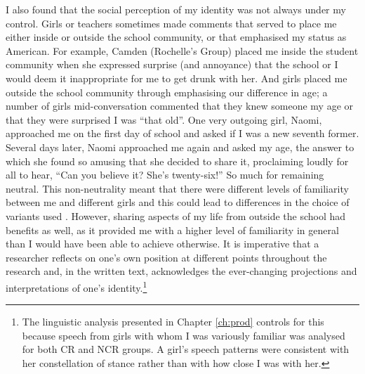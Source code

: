 I also found that the social perception of my identity was not always under my control. Girls or teachers sometimes made comments that served to place me either inside or outside the school community, or that emphasised my status as American. For example, Camden (Rochelle's Group) placed me inside the student community when she expressed surprise (and annoyance) that the school or I would deem it inappropriate for me to get drunk with her. And girls placed me outside the school community through emphasising our difference in age; a number of girls mid-conversation commented that they knew someone my age or that they were surprised I was ``that old''. One very outgoing girl, Naomi, approached me on the first day of school and asked if I was a new seventh former. Several days later, Naomi approached me again and asked my age, the answer to which she found so amusing that she decided to share it, proclaiming loudly for all to hear, ``Can you believe it?  She's twenty-six!''  So much for remaining neutral. This non-neutrality meant that there were different levels of familiarity between me and different girls and this could lead to differences in the choice of variants used \citep{cukoravilabailey}. However, sharing aspects of my life from outside the school had benefits as well, as it provided me with a higher level of familiarity in general than I would have been able to achieve otherwise. It is imperative that a researcher reflects on one's own position at different points throughout the research and, in the written text, acknowledges the ever-changing projections and interpretations of one's identity.\footnote{The linguistic analysis presented in Chapter \ref{ch:prod} controls for this because speech from girls with whom I was variously familiar was analysed for both CR and NCR groups. A girl's speech patterns were consistent with her constellation of stance rather than with how close I was with her.}  










